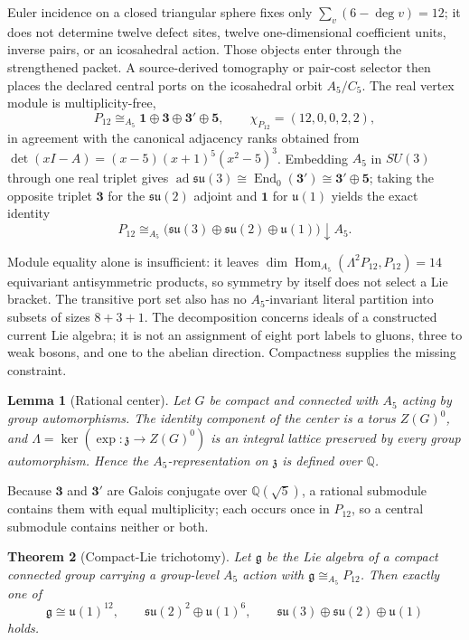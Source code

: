\documentclass[11pt]{article}
\newtheorem{theorem}{Theorem}[section]
\newtheorem{lemma}[theorem]{Lemma}
\begin{document}
Euler incidence on a closed triangular sphere fixes only
\(\sum_v(6-\deg v)=12\); it does not determine twelve defect sites, twelve
one-dimensional coefficient units, inverse pairs, or an icosahedral action.
Those objects enter through the strengthened packet. A source-derived
tomography or pair-cost selector then places the declared central ports on the
icosahedral orbit \(A_5/C_5\). The real vertex module is
multiplicity-free,
\[
  P_{12}\cong_{A_5}\mathbf 1\oplus\mathbf 3\oplus\mathbf 3'\oplus\mathbf 5,
  \qquad
  \chi_{P_{12}}=(12,0,0,2,2),
\]
in agreement with the canonical adjacency ranks obtained from
\(\det(xI-A)=(x-5)(x+1)^5(x^2-5)^3\). Embedding \(A_5\) in \(SU(3)\) through
one real triplet gives
\(\operatorname{ad}\mathfrak{su}(3)\cong\operatorname{End}_0(\mathbf3')
\cong\mathbf3'\oplus\mathbf5\); taking the opposite triplet \(\mathbf3\) for
the \(\mathfrak{su}(2)\) adjoint and \(\mathbf1\) for \(\mathfrak u(1)\) yields
the exact identity
\[
  P_{12}\cong_{A_5}
  \bigl(\mathfrak{su}(3)\oplus\mathfrak{su}(2)\oplus\mathfrak u(1)\bigr)
  \!\downarrow\!A_5 .
\]

Module equality alone is insufficient: it leaves
\(\dim\operatorname{Hom}_{A_5}(\Lambda^2P_{12},P_{12})=14\) equivariant
antisymmetric products, so symmetry by itself does not select a Lie bracket.
The transitive port set also has no \(A_5\)-invariant literal partition into
subsets of sizes \(8+3+1\). The decomposition concerns ideals of a constructed
current Lie algebra; it is not an assignment of eight port labels to gluons,
three to weak bosons, and one to the abelian direction.
Compactness supplies the missing constraint.

\begin{lemma}[Rational center]
Let \(G\) be compact and connected with \(A_5\) acting by group automorphisms.
The identity component of the center is a torus \(Z(G)^0\), and
\(\Lambda=\ker(\exp:\mathfrak z\to Z(G)^0)\) is an integral lattice preserved
by every group automorphism. Hence the \(A_5\)-representation on \(\mathfrak z\)
is defined over \(\mathbb Q\).
\end{lemma}

Because \(\mathbf3\) and \(\mathbf3'\) are Galois conjugate over
\(\mathbb Q(\sqrt5)\), a rational submodule contains them with equal
multiplicity; each occurs once in \(P_{12}\), so a central submodule contains
neither or both.

\begin{theorem}[Compact-Lie trichotomy]
Let \(\mathfrak g\) be the Lie algebra of a compact connected group carrying a
group-level \(A_5\) action with \(\mathfrak g\cong_{A_5}P_{12}\). Then exactly
one of
\[
  \mathfrak g\cong
  \mathfrak u(1)^{12},
  \qquad
  \mathfrak{su}(2)^{2}\oplus\mathfrak u(1)^{6},
  \qquad
  \mathfrak{su}(3)\oplus\mathfrak{su}(2)\oplus\mathfrak u(1)
\]
holds.
\end{theorem}
\end{document}
